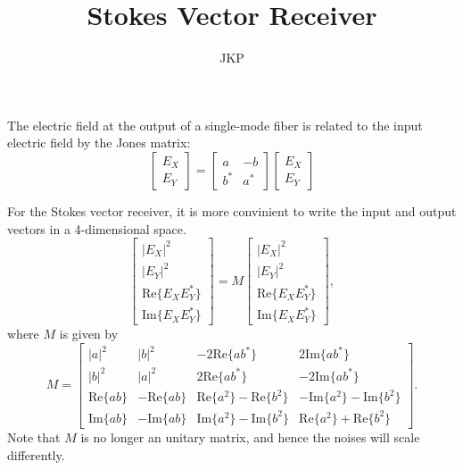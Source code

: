 \documentclass[a4paper]{article}
\title{Stokes Vector Receiver}
\author{JKP}
\begin{document}
\maketitle

The electric field at the output of a single-mode fiber is related to the input electric field by the Jones matrix:
\begin{equation}
\begin{bmatrix}
E_X\\
E_Y
\end{bmatrix} =\begin{bmatrix}
a & -b \\
b^* & a^*
\end{bmatrix}
\begin{bmatrix}
E_X\\
E_Y
\end{bmatrix}
\end{equation}

For the Stokes vector receiver, it is more convinient to write the input and output vectors in a 4-dimensional space.
\begin{equation}
\begin{bmatrix}
|E_X|^2 \\
|E_Y|^2 \\
\mathrm{Re}\{E_XE_Y^*\} \\
\mathrm{Im}\{E_XE_Y^*\} 
\end{bmatrix} = M\begin{bmatrix}
|E_X|^2 \\
|E_Y|^2 \\
\mathrm{Re}\{E_XE_Y^*\} \\
\mathrm{Im}\{E_XE_Y^*\} 
\end{bmatrix},
\end{equation}
where $M$ is given by
\begin{equation}
M = \begin{bmatrix}
|a|^2 & |b|^2 & -2\mathrm{Re}\{ab^*\} & 2\mathrm{Im}\{ab^*\} \\
|b|^2 & |a|^2 & 2\mathrm{Re}\{ab^*\} & -2\mathrm{Im}\{ab^*\} \\
\mathrm{Re}\{ab\} & -\mathrm{Re}\{ab\} & \mathrm{Re}\{a^2\}-\mathrm{Re}\{b^2\} & -\mathrm{Im}\{a^2\}-\mathrm{Im}\{b^2\} \\
\mathrm{Im}\{ab\} & -\mathrm{Im}\{ab\} & \mathrm{Im}\{a^2\}-\mathrm{Im}\{b^2\} & \mathrm{Re}\{a^2\}+\mathrm{Re}\{b^2\}
\end{bmatrix}.
\end{equation}
Note that $M$ is no longer an unitary matrix, and hence the noises will scale differently.
\end{document}
